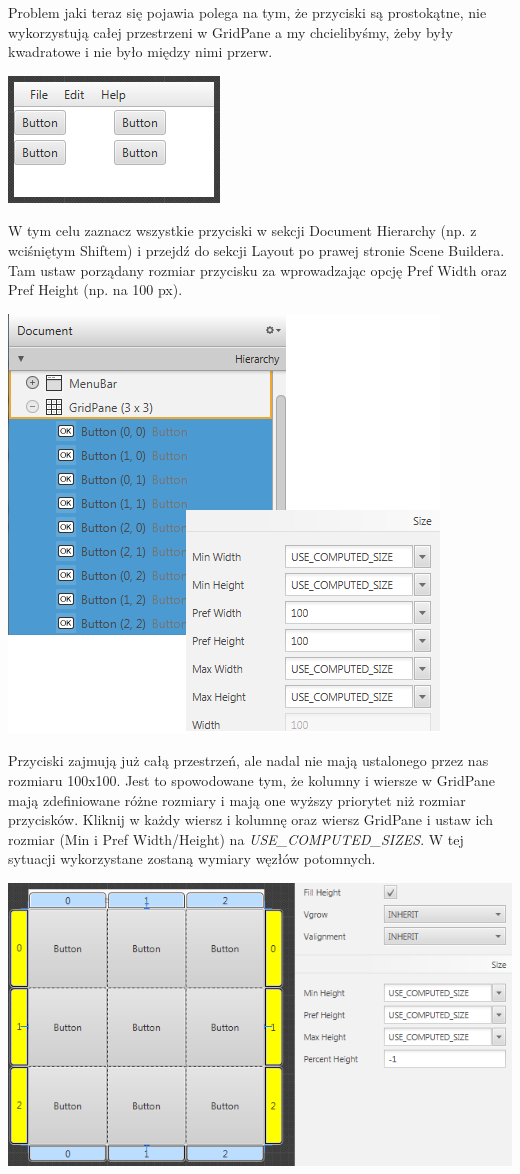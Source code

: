 \documentclass[letterpaper,10pt,english]{sphinxmanual}
\begin{document}
Problem jaki teraz się pojawia polega na tym, że przyciski są prostokątne, nie wykorzystują całej przestrzeni w GridPane a my chcielibyśmy, żeby były kwadratowe i nie było między nimi przerw.

{\hfill\includegraphics{size1.png}\hfill}

W tym celu zaznacz wszystkie przyciski w sekcji Document Hierarchy (np. z wciśniętym Shiftem) i przejdź do sekcji Layout po prawej stronie Scene Buildera. Tam ustaw porządany rozmiar przycisku za wprowadzając opcję Pref Width oraz Pref Height (np. na 100 px).

{\hfill\includegraphics{size2.png}\hfill}

Przyciski zajmują już całą przestrzeń, ale nadal nie mają ustalonego przez nas rozmiaru 100x100. Jest to spowodowane tym, że kolumny i wiersze w GridPane mają zdefiniowane różne rozmiary i mają one wyższy priorytet niż rozmiar przycisków. Kliknij w każdy wiersz i kolumnę oraz wiersz GridPane i ustaw ich rozmiar (Min i Pref Width/Height) na \emph{USE\_COMPUTED\_SIZES}. W tej sytuacji wykorzystane zostaną wymiary węzłów potomnych.

{\hfill\includegraphics{size3.png}\hfill}
\end{document}
